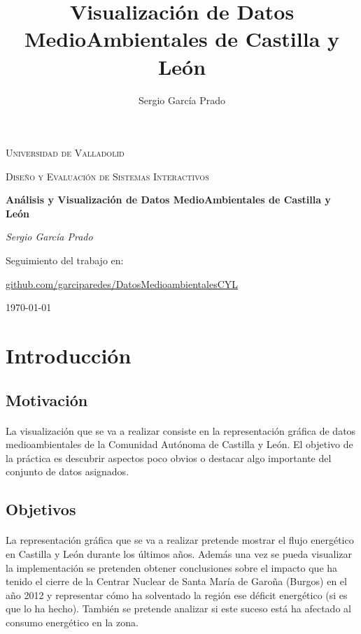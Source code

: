 \documentclass[11pt,spanish]{article}
\title{Visualización de Datos MedioAmbientales de Castilla y León}
\author{Sergio García Prado}
\begin{document}
	\begin{titlepage}
		\centering
		{\scshape\LARGE Universidad de Valladolid \par}
		\vspace{1cm}
		{\scshape\Large Diseño y Evaluación de Sistemas Interactivos\par}
		\vspace{1.5cm}
		{\huge\bfseries Análisis y Visualización de Datos MedioAmbientales de Castilla y León\par}
		\vspace{2cm}
		{\Large\itshape Sergio García Prado\par}

		\vfill
		Seguimiento del trabajo en: \par
		\href{https://github.com/garciparedes/DatosMedioambientalesCYL}{github.com/garciparedes/DatosMedioambientalesCYL}
		\vfill


		{\large \today\par}
	\end{titlepage}



	\newpage
		\tableofcontents
	\newpage


	\section{Introducción}

		\subsection{Motivación}

			\paragraph{}
			La visualización que se va a realizar consiste en la representación gráfica de datos medioambientales de la Comunidad Autónoma de Castilla y León. El objetivo de la práctica es descubrir aspectos poco obvios o destacar algo importante del conjunto de datos asignados.

		\subsection{Objetivos}

			\paragraph{}
			La representación gráfica que se va a realizar pretende mostrar el flujo energético en Castilla y León durante los últimos años. 
			Además una vez se pueda visualizar la implementación se pretenden obtener conclusiones sobre el impacto que ha tenido el cierre de la Centrar Nuclear de Santa María de Garoña (Burgos) en el año 2012 y representar cómo ha solventado la región ese déficit energético (si es que lo ha hecho). También se pretende analizar si este suceso está ha afectado al consumo energético en la zona.
\end{document}
